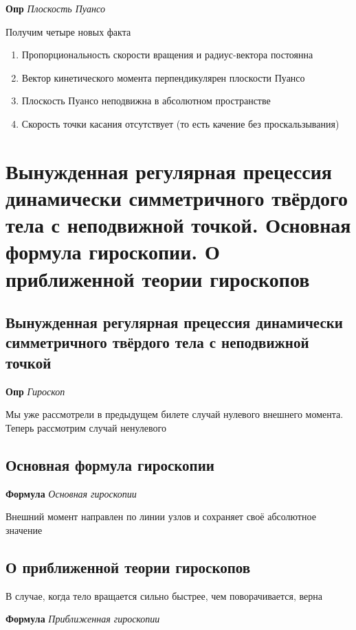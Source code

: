 \documentclass[a4paper, 14pt]{article}
\begin{document}
    \textbf{Опр} \textit{Плоскость Пуансо}
    
    Получим четыре новых факта
    
    \begin{enumerate}
        \item Пропорциональность скорости вращения и радиус-вектора постоянна
        \item Вектор кинетического момента перпендикулярен плоскости Пуансо
        \item Плоскость Пуансо неподвижна в абсолютном пространстве
        \item Скорость точки касания отсутствует (то есть качение без проскальзывания)
    \end{enumerate}
    
    \section{Вынужденная регулярная прецессия динамически симметричного твёрдого тела с неподвижной точкой.
Основная формула гироскопии.
    О приближенной теории гироскопов}
    
    \subsection{Вынужденная регулярная прецессия динамически симметричного твёрдого тела с неподвижной точкой}
    
    \textbf{Опр} \textit{Гироскоп}
    
    Мы уже рассмотрели в предыдущем билете случай нулевого внешнего момента.
    Теперь рассмотрим случай ненулевого
    
    \subsection{Основная формула гироскопии}
    
    \textbf{Формула} \textit{Основная гироскопии}
    
    Внешний момент направлен по линии узлов и сохраняет своё абсолютное значение
    
    \subsection{О приближенной теории гироскопов}
    
    В случае, когда тело вращается сильно быстрее, чем поворачивается, верна
    
    \textbf{Формула} \textit{Приближенная гироскопии}
    
\end{document}
